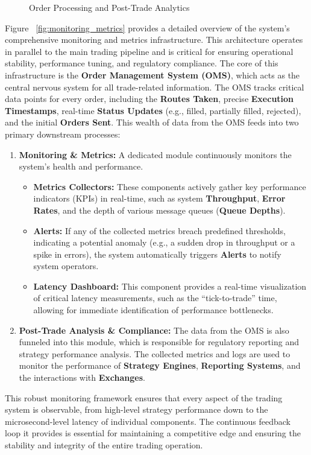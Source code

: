 \begin{figure}
    \centering
    
    \caption{Order Processing and Post-Trade Analytics} 
    \label{fig:order_processing_analytics} 
\end{figure}

Figure ~\ref{fig:monitoring_metrics} provides a detailed overview of the system's comprehensive monitoring and metrics infrastructure. This architecture operates in parallel to the main trading pipeline and is critical for ensuring operational stability, performance tuning, and regulatory compliance. The core of this infrastructure is the \textbf{Order Management System (OMS)}, which acts as the central nervous system for all trade-related information. The OMS tracks critical data points for every order, including the \textbf{Routes Taken}, precise \textbf{Execution Timestamps}, real-time \textbf{Status Updates} (e.g., filled, partially filled, rejected), and the initial \textbf{Orders Sent}. This wealth of data from the OMS feeds into two primary downstream processes: 
\begin{enumerate} 
    \item \textbf{Monitoring \& Metrics:} A dedicated module continuously monitors the system's health and performance.
        \begin{itemize} 
            \item \textbf{Metrics Collectors:} These components actively gather key performance indicators (KPIs) in real-time, such as system \textbf{Throughput}, \textbf{Error Rates}, and the depth of various message queues (\textbf{Queue Depths}). 
            \item \textbf{Alerts:} If any of the collected metrics breach predefined thresholds, indicating a potential anomaly (e.g., a sudden drop in throughput or a spike in errors), the system automatically triggers \textbf{Alerts} to notify system operators. 
            \item \textbf{Latency Dashboard:} This component provides a real-time visualization of critical latency measurements, such as the ``tick-to-trade'' time, allowing for immediate identification of performance bottlenecks. 
        \end{itemize} 
        \item \textbf{Post-Trade Analysis \& Compliance:} The data from the OMS is also funneled into this module, which is responsible for regulatory reporting and strategy performance analysis. The collected metrics and logs are used to monitor the performance of \textbf{Strategy Engines}, \textbf{Reporting Systems}, and the interactions with \textbf{Exchanges}.\end{enumerate}
This robust monitoring framework ensures that every aspect of the trading system is observable, from high-level strategy performance down to the microsecond-level latency of individual components. The continuous feedback loop it provides is essential for maintaining a competitive edge and ensuring the stability and integrity of the entire trading operation.


